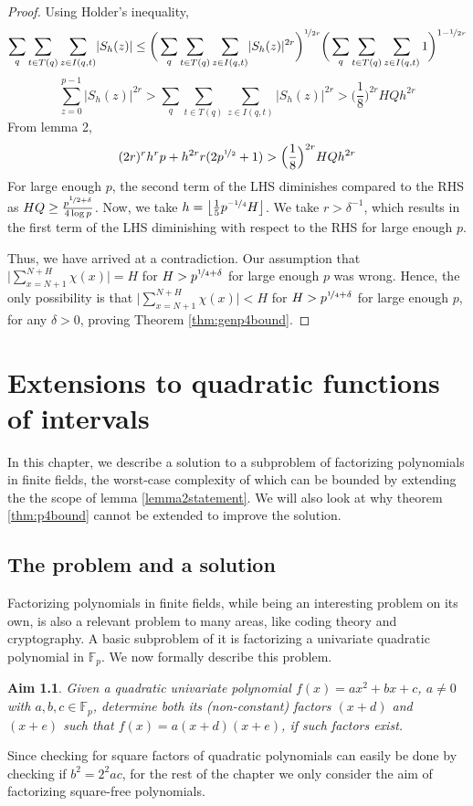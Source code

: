 \documentclass{report}
\newtheorem*{aim*}{Aim}
\newcommand{\ignore}[1]{}
\begin{document}
\begin{proof}
Using Holder's inequality,
$$\sum_q\sum\limits_{t\in T(q)}\sum\limits_{z\in I(q,t)}\lvert S_h(z) \rvert \leq \bigg ( \sum_q\sum\limits_{t\in T(q)}\sum\limits_{z\in I(q,t)}\lvert S_h(z) \rvert^{2r} \bigg )^{\nicefrac{1}{2r}}\bigg ( \sum_q\sum\limits_{t\in T(q)}\sum\limits_{z\in I(q,t)}1 \bigg )^{1-\nicefrac{1}{2r}}$$
$$\sum\limits_{z=0}^{p-1}\lvert S_h(z) \rvert^{2r}> \sum_q\sum\limits_{t\in T(q)}\sum\limits_{z\in I(q,t)}\lvert S_h(z) \rvert^{2r}> \Big(\frac{1}{8}\Big)^{2r}HQh^{2r}$$
From lemma 2,
$$(2r)^{r}h^{r}p+h^{2r}r(2p^{\nicefrac{1}{2}}+1)>\Big(\frac{1}{8}\Big)^{2r}HQh^{2r}$$
For large enough $p$, the second term of the LHS diminishes compared to the RHS as $HQ\geq \frac{p^{\nicefrac{1}{2}+\delta}}{4\log p}$. Now, we take $h=\left \lfloor \frac{1}{5}p^{\nicefrac{-1}{4}}H \right \rfloor$. We take $r>\delta^{-1}$, which results in the first term of the LHS diminishing with respect to the RHS for large enough $p$.

Thus, we have arrived at a contradiction. Our assumption that $\Big \lvert \sum\limits_{x=N+1}^{N+H}\chi(x)\Big \rvert=H$ for $H>p^{\nicefrac{1}{4}+\delta}$ for large enough $p$ was wrong. Hence, the only possibility is that $\Big \lvert \sum\limits_{x=N+1}^{N+H}\chi(x)\Big \rvert<H$ for $H>p^{\nicefrac{1}{4}+\delta}$ for large enough $p$, for any $\delta>0$, proving Theorem \ref{thm:genp4bound}.
\end{proof}
%
\chapter{Extensions to quadratic functions of intervals}
In this chapter, we describe a solution to a subproblem of factorizing polynomials in finite fields\ignore{a practically relevant problem}, the worst-case complexity of which can be bounded by extending the the scope of lemma \ref{lemma2statement}. We will also look at why theorem \ref{thm:p4bound} cannot be extended to improve the solution.
%
%
\section{The problem and a solution}
%
Factorizing polynomials in finite fields, while being an interesting problem on its own, is also a relevant problem  to many areas, like coding theory and cryptography. A basic subproblem of it is factorizing a univariate quadratic polynomial in $\mathbb{F}_p$. We now formally describe this problem.
%
\begin{aim*}
Given a quadratic univariate polynomial $f(x)=ax^2+bx+c$, $a\neq 0$ with $a,b,c\in\mathbb{F}_p$, determine both its (non-constant) factors $(x+d)$ and $(x+e)$ such that $f(x)=a(x+d)(x+e)$, if such factors exist.
\end{aim*}
%
Since checking for square factors of quadratic polynomials can easily be done by checking if $b^2=2^{2}ac$, for the rest of the chapter we only consider the aim of factorizing square-free polynomials.\ignore{We next describe a method to achieve this.}
\end{document}
